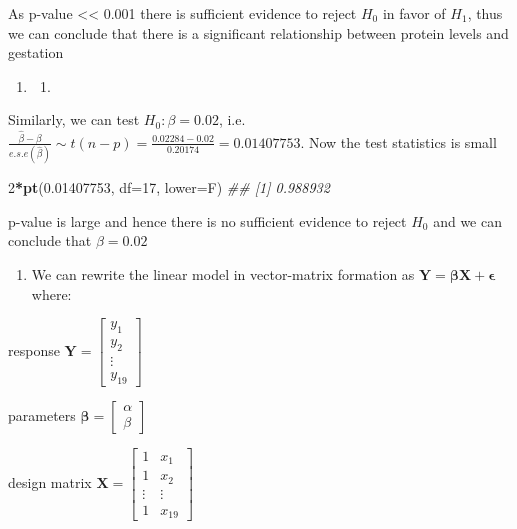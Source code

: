 \documentclass[
]{book}
\newenvironment{Shaded}{\begin{snugshade}}{\end{snugshade}}
\newcommand{\CommentTok}[1]{\textcolor[rgb]{0.56,0.35,0.01}{\textit{#1}}}
\newcommand{\DataTypeTok}[1]{\textcolor[rgb]{0.13,0.29,0.53}{#1}}
\newcommand{\DecValTok}[1]{\textcolor[rgb]{0.00,0.00,0.81}{#1}}
\newcommand{\FloatTok}[1]{\textcolor[rgb]{0.00,0.00,0.81}{#1}}
\newcommand{\KeywordTok}[1]{\textcolor[rgb]{0.13,0.29,0.53}{\textbf{#1}}}
\newcommand{\NormalTok}[1]{#1}
\newcommand{\OperatorTok}[1]{\textcolor[rgb]{0.81,0.36,0.00}{\textbf{#1}}}
\providecommand{\tightlist}{%
  \setlength{\itemsep}{0pt}\setlength{\parskip}{0pt}}
\theoremstyle{definition}
\theoremstyle{definition}
\theoremstyle{definition}
\theoremstyle{remark}
\begin{document}
As p-value \textless\textless{} 0.001 there is sufficient evidence to reject \(H_0\) in favor of \(H_1\), thus we can conclude that there is a significant relationship between protein levels and gestation

\begin{enumerate}
\def\labelenumi{\alph{enumi})}
\setcounter{enumi}{1}
\item
  \begin{enumerate}
  \def\labelenumii{\roman{enumii}.}
  \setcounter{enumii}{1}
  \tightlist
  \item
  \end{enumerate}
\end{enumerate}

Similarly, we can test \(H_0:\beta = 0.02\), i.e.~\(\frac{\hat{\beta} - \beta}{e.s.e(\hat{\beta})} \sim t(n-p) = \frac{0.02284 - 0.02}{0.20174} = 0.01407753\). Now the test statistics is small

\begin{Shaded}
\begin{Highlighting}[]
\DecValTok{2}\OperatorTok{*}\KeywordTok{pt}\NormalTok{(}\FloatTok{0.01407753}\NormalTok{, }\DataTypeTok{df=}\DecValTok{17}\NormalTok{, }\DataTypeTok{lower=}\NormalTok{F)}
\CommentTok{\#\# [1] 0.988932}
\end{Highlighting}
\end{Shaded}

p-value is large and hence there is no sufficient evidence to reject \(H_0\) and we can conclude that \(\beta = 0.02\)

\begin{enumerate}
\def\labelenumi{\alph{enumi})}
\setcounter{enumi}{2}
\tightlist
\item
  We can rewrite the linear model in vector-matrix formation as \(\mathbf{Y}= \mathbf{\beta}\mathbf{X} + \mathbf{\epsilon}\) where:
\end{enumerate}

response \(\mathbf{Y}=\begin{bmatrix}  y_1 \\  y_2 \\  \vdots \\  y_{19} \end{bmatrix}\)

parameters \(\boldsymbol\beta=\begin{bmatrix}  \alpha \\  \beta \end{bmatrix}\)

design matrix \(\mathbf{X}=\begin{bmatrix}  1 & x_1 \\  1 & x_2 \\  \vdots & \vdots \\  1 & x_{19} \end{bmatrix}\)
\end{document}
